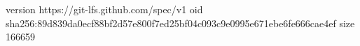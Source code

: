 version https://git-lfs.github.com/spec/v1
oid sha256:89d839da0ecf88bf2d57e800f7ed25bf04c093c9e0995e671ebe6fe666cae4ef
size 166659
